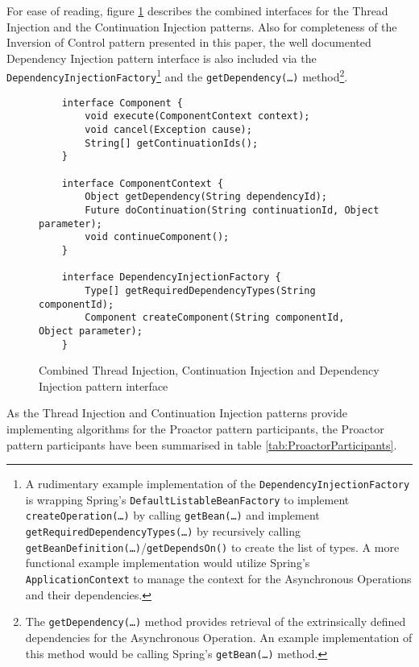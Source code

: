\documentclass[prodmode]{style/acmlarge}
\begin{document}
For ease of reading, figure \ref{fig:InjectionInterfaces} describes the combined
interfaces for the Thread Injection and the Continuation Injection patterns.
Also for completeness of the Inversion of Control pattern presented in this
paper, the well documented Dependency Injection pattern \cite{ioc} interface is
also included via the \texttt{DependencyInjectionFactory}\footnote{A rudimentary
example implementation of the \texttt{DependencyInjectionFactory} is wrapping
Spring's \cite{spring} \texttt{DefaultListableBeanFactory} to implement
\texttt{createOperation(\ldots)} by calling \texttt{getBean(\ldots)} and
implement \texttt{getRequiredDependencyTypes(\ldots)} by recursively calling
\texttt{getBeanDefinition(\ldots)}/\texttt{getDependsOn()} to create the list of
types.  A more functional example implementation would utilize Spring's
\texttt{ApplicationContext} to manage the context for the Asynchronous
Operations and their dependencies.} and the \texttt{getDependency(\ldots)}
method\footnote{The \texttt{getDependency(\ldots)} method provides retrieval of
the extrinsically defined dependencies for the Asynchronous Operation.  An
example implementation of this method would be calling Spring's \cite{spring}
\texttt{getBean(\ldots)} method.}.


\begin{figure}[tp]
\centering
\begin{verbatim}
    interface Component {
        void execute(ComponentContext context);
        void cancel(Exception cause);
        String[] getContinuationIds();
    }

    interface ComponentContext {
        Object getDependency(String dependencyId);
        Future doContinuation(String continuationId, Object parameter);
        void continueComponent();
    }
    
    interface DependencyInjectionFactory {
        Type[] getRequiredDependencyTypes(String componentId);
        Component createComponent(String componentId, Object parameter);
    }
\end{verbatim}
\caption{Combined Thread Injection, Continuation Injection and Dependency Injection pattern interface\footnotemark}
\label{fig:InjectionInterfaces}
\end{figure}

As the Thread Injection and Continuation Injection patterns provide implementing
algorithms for the Proactor pattern participants, the Proactor pattern
participants have been summarised in table \ref{tab:ProactorParticipants}.
\end{document}
